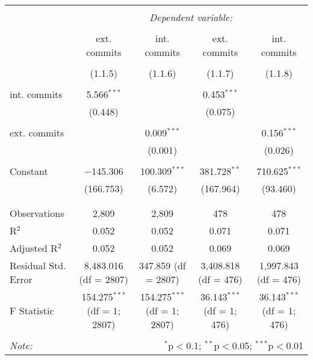 
\begin{tabular}{@{\extracolsep{5pt}}lcccc}
\\[-1.8ex]\hline
\hline \\[-1.8ex]
 & \multicolumn{4}{c}{\textit{Dependent variable:}} \\
\cline{2-5}
\\[-1.8ex] & ext. commits & int. commits & ext. commits & int. commits \\
\\[-1.8ex] & (1.1.5) & (1.1.6) & (1.1.7) & (1.1.8)\\ 
\hline \\[-1.8ex]
 int. commits & 5.566$^{***}$ &  & 0.453$^{***}$ &  \\
  & (0.448) &  & (0.075) &  \\
  & & & & \\
 ext. commits &  & 0.009$^{***}$ &  & 0.156$^{***}$ \\
  &  & (0.001) &  & (0.026) \\
  & & & & \\
 Constant & $-$145.306 & 100.309$^{***}$ & 381.728$^{**}$ & 710.625$^{***}$ \\
  & (166.753) & (6.572) & (167.964) & (93.460) \\
  & & & & \\
\hline \\[-1.8ex]
Observations & 2,809 & 2,809 & 478 & 478 \\
R$^{2}$ & 0.052 & 0.052 & 0.071 & 0.071 \\
Adjusted R$^{2}$ & 0.052 & 0.052 & 0.069 & 0.069 \\
Residual Std. Error & 8,483.016 (df = 2807) & 347.859 (df = 2807) & 3,408.818 (df = 476) & 1,997.843 (df = 476) \\
F Statistic & 154.275$^{***}$ (df = 1; 2807) & 154.275$^{***}$ (df = 1; 2807) & 36.143$^{***}$ (df = 1; 476) & 36.143$^{***}$ (df = 1; 476) \\
\hline
\hline \\[-1.8ex]
\textit{Note:}  & \multicolumn{4}{r}{$^{*}$p$<$0.1; $^{**}$p$<$0.05; $^{***}$p$<$0.01} \\
\end{tabular}
